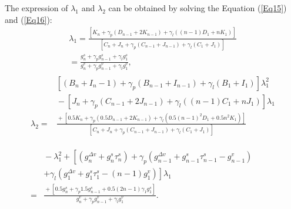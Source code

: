 \documentclass[journal]{IEEEtran}
\begin{document}
The expression of $\lambda_1$ and $\lambda_2$ can be obtained by solving the Equation (\ref{Eq15}) and (\ref{Eq16}):
\begin{equation}
  \begin{gathered}
    \lambda_{1}=\frac{\left[K_{n}+\gamma_{p}\left(D_{n\!-\!1}+2 K_{n\!-\!1}\right)+\gamma_{l}\left((n\!-\!1) D_{1}+n K_{1}\right)\right]}{\left[C_{n}+J_{n}+\gamma_{p}\left(C_{n\!-\!1}+J_{n\!-\!1}\right)+\gamma_{l}\left(C_{1}+J_{1}\right)\right]} \\
    =\frac{g_{n}^{s}+\gamma_{p} g_{n\!-\!1}^{s}+\gamma_{l} g_{1}^{s}}{g_{n}^{v}+\gamma_{p} g_{n\!-\!1}^{v}+\gamma_{l} g_{1}^{v}},
  \end{gathered}
  \label{Eq17}
\end{equation}
\begin{equation}
  \begin{gathered}
    \begin{aligned}
                   & {\left[\left(B_{n}\!+\!I_{n}\!-\!1\right)\!+\!\gamma_{p}\left(B_{n\!-\!1}\!+\!I_{n\!-\!1}\right)\!+\!\gamma_{l}\left(B_{1}\!+\!I_{1}\right)\right] \lambda_{1}^{2}}                                                                                                                                  \\
                   & \!-\!\left[J_{n}\!+\!\gamma_{p}\left(C_{n\!-\!1}\!+\!2 J_{n\!-\!1}\right)\!+\!\gamma_{l}\left(\left(n\!-\!1\right) C_{1}\!+\!n J_{1}\right)\right] \lambda_{1}                                                                                                                                       \\
      \lambda_{2}= & \frac{\!+\!\left[0.5 K_{n}\!+\!\gamma_{p}\left(0.5 D_{n\!-\!1}\!+\!2 K_{n\!-\!1}\right)\!+\!\gamma_{l}\left(0.5(n\!-\!1)^{2} D_{1}\!+\!0.5n^{2} K_{1}\right)\right]}{\left[C_{n}\!+\!J_{n}\!+\!\gamma_{p}\left(C_{n\!-\!1}\!+\!J_{n\!-\!1}\right)\!+\!\gamma_{l}\left(C_{1}\!+\!J_{1}\right)\right]} \\
      \\
    \end{aligned}
    \\
    \begin{aligned}
        & \!-\!\lambda_{1}^{2}\!+\!\left[\left(g_{n}^{\Delta v}\!+\!g_{n}^{s} \tau_{n}^{s}\right)\!+\!\gamma_{p}\left(g_{n\!-\!1}^{\Delta v}\!+\!g_{n\!-\!1}^{s} \tau_{n\!-\!1}^{s}\!-\!g_{n\!-\!1}^{v}\right)\right. \\
        & \left.+\gamma_{l}\left(g_{1}^{\Delta v}\!+\!g_{1}^{s} \tau_{1}^{s}\!-\!(n\!-\!1) g_{1}^{v}\right)\right] \lambda_{1}                                                                                        \\
      = & \frac{\!+\!\left[0.5 g_{n}^{s}\!+\!\gamma_{p} 1.5 g_{n\!-\!1}^{s}\!+\!0.5(2 n\!-\!1) \gamma_{1} g_{1}^{s}\right]}{g_{n}^{v}\!+\!\gamma_{p} g_{n\!-\!1}^{v}\!+\!\gamma_{l} g_{1}^{v}}.
    \end{aligned}
  \end{gathered}
  \label{Eq18}
\end{equation}
\end{document}
